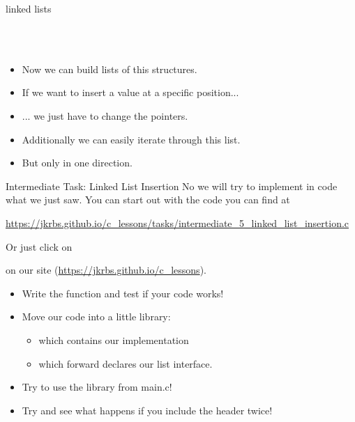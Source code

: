\documentclass[10pt,graphics,aspectratio=169,table]{beamer}
\begin{document}
\begin{frame}{linked lists}
\begin{tikzpicture}[scale=.73,font=\scriptsize]
		
	\end{tikzpicture}
	\ \\\ \\
	\begin{itemize}[<+->]
		\item Now we can build lists of this structures.
		\item If we want to insert a value at a specific position...
		\item ... we just have to change the pointers.
	\end{itemize}
	
	\begin{itemize}
		\item<6-> Additionally we can easily iterate through this list.
		\item<6-> But only in one direction.
	\end{itemize}
	
\end{frame}

\begin{frame}{Intermediate Task: Linked List Insertion}
    No we will try to implement in code what we just saw.
    You can start out with the code you can find at

    \url{https://jkrbs.github.io/c_lessons/tasks/intermediate_5_linked_list_insertion.c}
    
    Or just click on 

   
    on our site (\url{https://jkrbs.github.io/c_lessons}).

    \begin{itemize}
		\item Write the function  and test if your code works!
        \item Move our code into a little library: 
        \begin{itemize}
            \item {} which contains our implementation
            \item {} which forward declares our list interface.
        \end{itemize}
        \item Try to use the library from main.c!
		\item Try and see what happens if you include the  header twice!
	\end{itemize}
\end{frame}
\end{document}
